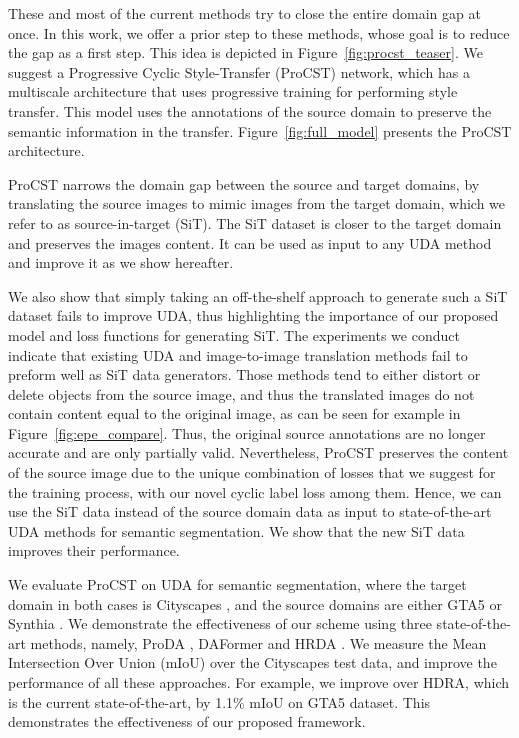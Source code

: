 \documentclass[letterpaper]{article} \usepackage[]{aaai23}  \usepackage{times}  \usepackage{helvet}  \usepackage{courier}  \usepackage[hyphens]{url}  \usepackage{graphicx} \urlstyle{rm} \def\UrlFont{\rm}  \usepackage{natbib}  \usepackage{caption} \frenchspacing  \setlength{\pdfpagewidth}{8.5in} \setlength{\pdfpageheight}{11in} \usepackage{algorithm}
\begin{document}
These and most of the current methods try to close the entire domain gap at once. In this work, we offer a prior step to these methods, whose goal is to reduce the gap as a first step. This idea is depicted in Figure~\ref{fig:procst_teaser}. We suggest a Progressive Cyclic Style-Transfer (ProCST) network, which has a multiscale architecture that uses progressive training for performing style transfer. This model uses the annotations of the source domain to preserve the semantic information in the transfer. Figure~\ref{fig:full_model} presents the ProCST architecture. 

ProCST narrows the domain gap between the source and target domains, by translating the source images to mimic images from the target domain, which we refer to as source-in-target (SiT). The SiT dataset is closer to the target domain and preserves the images content. It can be used as input to any UDA method and improve it as we show hereafter.

We also show that simply taking an off-the-shelf approach to generate such a SiT dataset fails to improve UDA, thus highlighting the importance of our proposed model and loss functions for generating SiT.
The experiments we conduct indicate that existing UDA and image-to-image translation methods fail to preform well as SiT data generators. Those methods tend to either distort or delete objects from the source image, and thus the translated images do not contain content equal to the original image, as can be seen for example in Figure~\ref{fig:epe_compare}. Thus, the original source annotations are no longer accurate and are only partially valid. Nevertheless, ProCST preserves the content of the source image due to the unique combination of losses that we suggest for the training process, with our novel cyclic label loss among them. Hence, we can use the SiT data instead of the source domain data as input to state-of-the-art UDA methods for semantic segmentation. We show that the new SiT data improves their performance. 

We evaluate ProCST on UDA for semantic segmentation, where the target domain in both cases is Cityscapes \cite{cityscapes}, and the source domains are either GTA5 \cite{GTA5} or Synthia \cite{synthia}. We demonstrate the effectiveness of our scheme using three state-of-the-art methods, namely, ProDA \cite{zhang2021prototypical}, DAFormer \cite{hoyer2021daformer} and HRDA \cite{hoyer2022hrda}. We measure the Mean Intersection Over Union (mIoU) over the Cityscapes test data, and improve the performance of all these approaches. For example, we improve over HDRA, which is the current state-of-the-art, by 1.1\% mIoU on GTA5 dataset. This demonstrates the effectiveness of our proposed framework.
\end{document}
